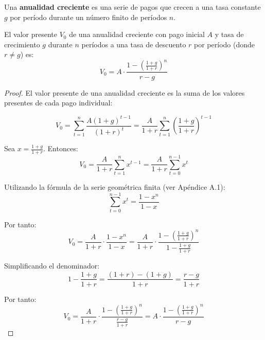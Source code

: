 \begin{definicion}
Una \textbf{anualidad creciente} es una serie de pagos que crecen a una tasa constante $g$ por período durante un número finito de períodos $n$.
\end{definicion}

\begin{teorema}
El valor presente $V_0$ de una anualidad creciente con pago inicial $A$ y tasa de crecimiento $g$ durante $n$ períodos a una tasa de descuento $r$ por período (donde $r \neq g$) es:
\begin{equation}
V_0 = A \cdot \frac{1 - \left(\frac{1 + g}{1 + r}\right)^n}{r - g}
\end{equation}
\end{teorema}

\begin{proof}
El valor presente de una anualidad creciente es la suma de los valores presentes de cada pago individual:

$$V_0 = \sum_{t=1}^{n} \frac{A(1 + g)^{t-1}}{(1 + r)^t} = \frac{A}{1 + r} \sum_{t=1}^{n} \left(\frac{1 + g}{1 + r}\right)^{t-1}$$

Sea $x = \frac{1 + g}{1 + r}$. Entonces:
$$V_0 = \frac{A}{1 + r} \sum_{t=1}^{n} x^{t-1} = \frac{A}{1 + r} \sum_{t=0}^{n-1} x^t$$

Utilizando la fórmula de la serie geométrica finita (ver Apéndice A.1):
$$\sum_{t=0}^{n-1} x^t = \frac{1 - x^n}{1 - x}$$

Por tanto:
$$V_0 = \frac{A}{1 + r} \cdot \frac{1 - x^n}{1 - x} = \frac{A}{1 + r} \cdot \frac{1 - \left(\frac{1 + g}{1 + r}\right)^n}{1 - \frac{1 + g}{1 + r}}$$

Simplificando el denominador:
$$1 - \frac{1 + g}{1 + r} = \frac{(1 + r) - (1 + g)}{1 + r} = \frac{r - g}{1 + r}$$

Por tanto:
$$V_0 = \frac{A}{1 + r} \cdot \frac{1 - \left(\frac{1 + g}{1 + r}\right)^n}{\frac{r - g}{1 + r}} = A \cdot \frac{1 - \left(\frac{1 + g}{1 + r}\right)^n}{r - g}$$
\end{proof}

\begin{center}
    
\end{center}

